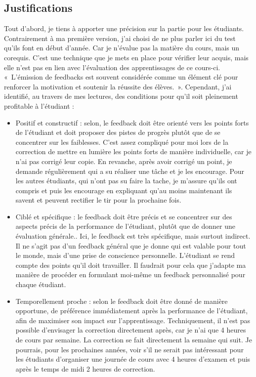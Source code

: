 \subsection{Justifications}
\label{evaluation_des_apprentissages_justifications}

Tout d'abord, je tiens à apporter une précision sur la partie pour les étudiants. Contrairement à ma première version, j'ai choisi de ne plus parler ici du test qu'ils font en début d'année. Car je n'évalue pas la matière du cours, mais un corequis. C'est une technique que je mets en place pour vérifier leur acquis, mais elle n'est pas en lien avec l'évaluation des apprentissages de ce cours-ci.\\

«~L’émission de feedbacks est souvent considérée comme un élément clé pour renforcer la motivation et soutenir la réussite des élèves.~»\cite{georges2011feedbacks}. Cependant, j'ai identifié, au travers de mes lectures, des conditions pour qu'il soit pleinement profitable à l'étudiant :

\begin{itemize}
    \item Positif et constructif : selon, \citet{hattie2007power,} le feedback doit être orienté vers les points forts de l'étudiant et doit proposer des pistes de progrès plutôt que de se concentrer sur les faiblesses. C'est assez compliqué pour moi lors de la correction de mettre en lumière les points forts de manière individuelle, car je n'ai pas corrigé leur copie. En revanche, après avoir corrigé un point, je demande régulièrement qui a su réaliser une tâche et je les encourage. Pour les autres étudiants, qui n'ont pas su faire la tache, je m'assure qu'ils ont compris et puis les encourage en expliquant qu’au moins maintenant ils savent et peuvent rectifier le tir pour la prochaine fois.
    \item Ciblé et spécifique : le feedback doit être précis et se concentrer sur des aspects précis de la performance de l'étudiant, plutôt que de donner une évaluation générale.\cite{black1998assessment}. Ici, le feedback est très spécifique, mais surtout indirect. Il ne s'agit pas d'un feedback général que je donne qui est valable pour tout le monde, mais d'une prise de conscience personnelle. L'étudiant se rend compte des points qu'il doit travailler. Il faudrait pour cela que j'adapte ma manière de procéder en formulant moi-même un feedback personnalisé pour chaque étudiant.
    \item Temporellement proche : selon \citet{kluger1996effects} le feedback doit être donné de manière opportune, de préférence immédiatement après la performance de l'étudiant, afin de maximiser son impact sur l'apprentissage. Techniquement, il n'est pas possible d'envisager la correction directement après, car je n'ai que 4 heures de cours par semaine. La correction se fait directement la semaine qui suit. Je pourrais, pour les prochaines années, voir s'il ne serait pas intéressant pour les étudiants d'organiser une journée de cours avec 4 heures d'examen et puis après le temps de midi 2 heures de correction.
\end{itemize}

